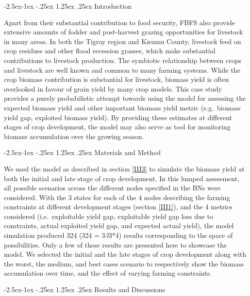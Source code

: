 \documentclass[12pt,oneside]{article}
\makeatletter
\renewcommand\paragraph{\@startsection{paragraph}{4}{\z@}%
            {-2.5ex\@plus -1ex \@minus -.25ex}%
            {1.25ex \@plus .25ex}%
            {\normalfont\normalsize\bfseries}}
\makeatother
\begin{document}
\hypertarget{IV221}{%
\paragraph{Introduction}\label{IV221}}

Apart from their substantial contribution to food security, FBFS also provide extensive amounts of fodder and post-harvest grazing opportunities for livestock in many areas. In both the Tigray region and Kisumu County, livestock feed on crop residues and other flood recession grasses, which make substantial contributions to livestock production. The symbiotic relationship between crops and livestock are well known and common to many farming systems. While the crop biomass contribution is substantial for livestock, biomass yield is often overlooked in favour of grain yield by many crop models. This case study provides a purely probabilistic attempt towards using the model for assessing the expected biomass yield and other important biomass yield metric (e.g.~biomass yield gap, exploited biomass yield). By providing these estimates at different stages of crop development, the model may also serve as tool for monitoring biomass accumulation over the growing season.

\hypertarget{IV222}{%
\paragraph{Materials and Method}\label{IV222}}

We used the model as described in section \ref{III3} to simulate the biomass yield at both the initial and late stage of crop development. In this lumped assessment, all possible scenarios across the different nodes specified in the BNs were considered. With the 3 states for each of the 4 nodes describing the farming constraints at different development stages (section \ref{III1}), and the 4 metrics considered (i.e.~exploitable yield gap, exploitable yield gap loss due to constraints, actual exploited yield gap, and expected actual yield), the model simulation produced 324 (324 = 3\emph{3}3*4) results corresponding to the space of possibilities. Only a few of these results are presented here to showcase the model. We selected the initial and the late stages of crop development along with the worst, the medium, and best cases scenario to respectively show the biomass accumulation over time, and the effect of varying farming constraints.

\hypertarget{IV223}{%
\paragraph{Results and Discussions}\label{IV223}}
\end{document}

